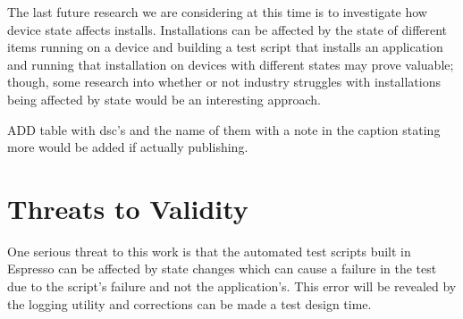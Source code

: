 The last future research we are considering at this time is to investigate how device state affects installs.  Installations can be affected by the state of different items running on a device and building a test script that installs an application and running that installation on devices with different states may prove valuable; though, some research into whether or not industry struggles with installations being affected by state would be an interesting approach.  

ADD table with dsc's and the name of them with a note in the caption stating more would be added if actually publishing.  


\section{Threats to Validity}
One serious threat to this work is that the automated test scripts built in Espresso can be affected by state changes \cite{7927971} which can cause a failure in the test due to the script's failure and not the application's.  This error will be revealed by the logging utility and corrections can be made a test design time.  

